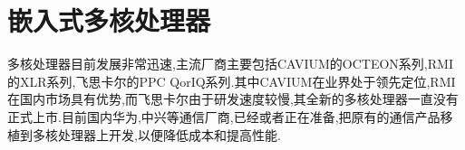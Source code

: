 \section{嵌入式多核处理器}
多核处理器目前发展非常迅速,主流厂商主要包括CAVIUM的OCTEON系列,RMI的XLR系列,飞思卡尔的PPC QorIQ系列.其中CAVIUM在业界处于领先定位,RMI在国内市场具有优势,而飞思卡尔由于研发速度较慢,其全新的多核处理器一直没有正式上市.目前国内华为,中兴等通信厂商,已经或者正在准备,把原有的通信产品移植到多核处理器上开发,以便降低成本和提高性能.


